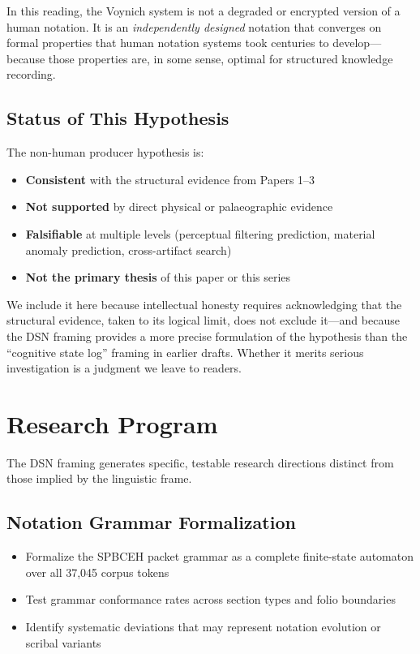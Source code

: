 \documentclass[11pt,a4paper,twocolumn]{article}
\begin{document}
In this reading, the Voynich system is not a degraded or encrypted version of a human notation. It is an \textit{independently designed} notation that converges on formal properties that human notation systems took centuries to develop---because those properties are, in some sense, optimal for structured knowledge recording.

\subsection{Status of This Hypothesis}

The non-human producer hypothesis is:

\begin{itemize}[leftmargin=*,itemsep=2pt]
    \item \textbf{Consistent} with the structural evidence from Papers 1--3
    \item \textbf{Not supported} by direct physical or palaeographic evidence
    \item \textbf{Falsifiable} at multiple levels (perceptual filtering prediction, material anomaly prediction, cross-artifact search)
    \item \textbf{Not the primary thesis} of this paper or this series
\end{itemize}

\noindent We include it here because intellectual honesty requires acknowledging that the structural evidence, taken to its logical limit, does not exclude it---and because the DSN framing provides a more precise formulation of the hypothesis than the ``cognitive state log'' framing in earlier drafts. Whether it merits serious investigation is a judgment we leave to readers.

\section{Research Program}
\label{sec:future}

The DSN framing generates specific, testable research directions distinct from those implied by the linguistic frame.

\subsection{Notation Grammar Formalization}

\begin{itemize}[leftmargin=*,itemsep=2pt]
    \item Formalize the SPBCEH packet grammar as a complete finite-state automaton over all 37,045 corpus tokens
    \item Test grammar conformance rates across section types and folio boundaries
    \item Identify systematic deviations that may represent notation evolution or scribal variants
\end{itemize}
\end{document}
